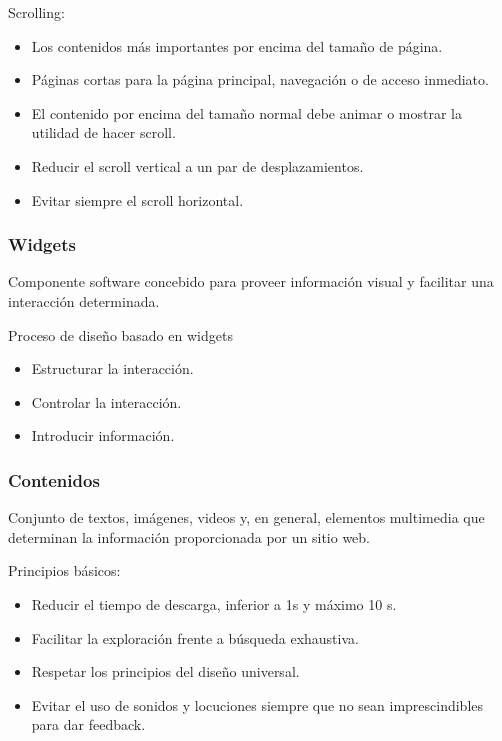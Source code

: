 \documentclass[12pt, twoside, openright]{report} %
\begin{document}
Scrolling:
\begin{itemize}
	\item Los contenidos más importantes por encima del tamaño de página.
	\item Páginas cortas para la página principal, navegación o de acceso inmediato.
	\item El contenido por encima del tamaño normal debe animar o mostrar la
	      utilidad de hacer scroll.
	\item Reducir el scroll vertical a un par de
	      desplazamientos.
	\item Evitar siempre el scroll horizontal.
\end{itemize}


\subsubsection{Widgets}
Componente software concebido para proveer información visual y facilitar una interacción determinada.

Proceso de diseño basado en widgets
\begin{itemize}
	\item Estructurar la interacción.
	\item Controlar la interacción.
	\item Introducir información.
\end{itemize}
\pagebreak
\subsubsection{Contenidos}
Conjunto de textos, imágenes, videos y, en general, elementos multimedia que determinan la información proporcionada por un sitio web.

Principios básicos:
\begin{itemize}
	\item Reducir el tiempo de descarga, inferior a 1s y máximo 10 s.
	\item Facilitar la exploración frente a búsqueda exhaustiva.
	\item Respetar los principios del diseño universal.
	\item Evitar el uso de sonidos y locuciones siempre que no sean imprescindibles para dar feedback.
\end{itemize}
\end{document}
